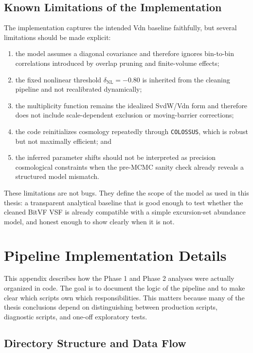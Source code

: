 \documentclass[12pt]{report}
\begin{document}
\section{Known Limitations of the Implementation}

The implementation captures the intended Vdn baseline faithfully, but several limitations should be made explicit:
\begin{enumerate}
    \item the model assumes a diagonal covariance and therefore ignores bin-to-bin correlations introduced by overlap pruning and finite-volume effects;
    \item the fixed nonlinear threshold $\delta_\mathrm{NL}=-0.80$ is inherited from the cleaning pipeline and not recalibrated dynamically;
    \item the multiplicity function remains the idealized SvdW/Vdn form and therefore does not include scale-dependent exclusion or moving-barrier corrections;
    \item the code reinitializes cosmology repeatedly through \texttt{COLOSSUS}, which is robust but not maximally efficient; and
    \item the inferred parameter shifts should not be interpreted as precision cosmological constraints when the pre-MCMC sanity check already reveals a structured model mismatch.
\end{enumerate}

These limitations are not bugs. They define the scope of the model as used in this thesis: a transparent analytical baseline that is good enough to test whether the cleaned BitVF VSF is already compatible with a simple excursion-set abundance model, and honest enough to show clearly when it is not.


\chapter{Pipeline Implementation Details}
\label{app:pipeline}

This appendix describes how the Phase 1 and Phase 2 analyses were actually organized in code. The goal is to document the logic of the pipeline and to make clear which scripts own which responsibilities. This matters because many of the thesis conclusions depend on distinguishing between production scripts, diagnostic scripts, and one-off exploratory tests.

\section{Directory Structure and Data Flow}
\end{document}
